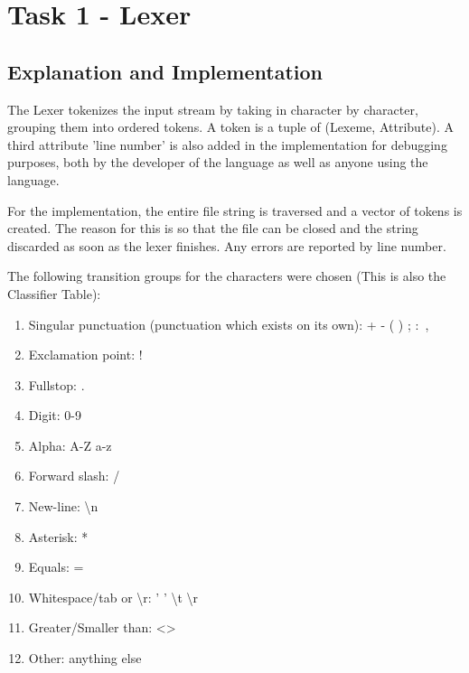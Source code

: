\section{Task 1 - Lexer}
\subsection{Explanation and Implementation}
The Lexer tokenizes the input stream by taking in character by character, grouping them into ordered tokens. A token is a tuple of (Lexeme, Attribute). A third attribute 'line number' is also added in the implementation for debugging purposes, both by the developer of the language as well as anyone using the language.

For the implementation, the entire file string is traversed and a vector of tokens is created. The reason for this is so that the file can be closed and the string discarded as soon as the lexer finishes. Any errors are reported by line number.

The following transition groups for the characters were chosen (This is also the Classifier Table):
\begin{enumerate}
	\item Singular punctuation (punctuation which exists on its own): + - ( ) \textbraceleft \textbraceright ; $\colon$ ,
	\item Exclamation point: !
	\item Fullstop: .
	\item Digit: 0-9
	\item Alpha: A-Z a-z \textunderscore
	\item Forward slash: /
	\item New-line: \textbackslash n
	\item Asterisk: *
	\item Equals: =
	\item Whitespace/tab or \textbackslash r: ' ' \textbackslash t \textbackslash r
	\item Greater/Smaller than: \textless  \textgreater
	\item Other: anything else
\end{enumerate}

